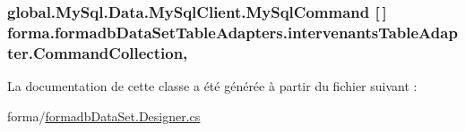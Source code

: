 \subsubsection[{\texorpdfstring{Command\+Collection}{CommandCollection}}]{\setlength{\rightskip}{0pt plus 5cm}global.\+My\+Sql.\+Data.\+My\+Sql\+Client.\+My\+Sql\+Command \mbox{[}$\,$\mbox{]} forma.\+formadb\+Data\+Set\+Table\+Adapters.\+intervenants\+Table\+Adapter.\+Command\+Collection\hspace{0.3cm}{\ttfamily [get]}, {\ttfamily [protected]}}\hypertarget{classforma_1_1formadb_data_set_table_adapters_1_1intervenants_table_adapter_a374dbac06562901a5db6a456eacf8d34}{}\label{classforma_1_1formadb_data_set_table_adapters_1_1intervenants_table_adapter_a374dbac06562901a5db6a456eacf8d34}


La documentation de cette classe a été générée à partir du fichier suivant \+:\begin{DoxyCompactItemize}
\item 
forma/\hyperlink{formadb_data_set_8_designer_8cs}{formadb\+Data\+Set.\+Designer.\+cs}\end{DoxyCompactItemize}

